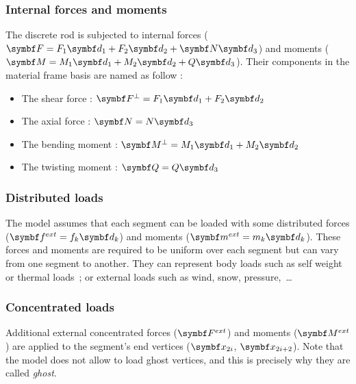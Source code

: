  \subsubsection{Internal forces and moments}
The discrete rod is subjected to internal forces ($\vect{F} = F_1 \vect{d}_1 + F_2 \vect{d}_2 + \vect{N}\vect{d}_3$) and moments ($\vect{M} = M_1 \vect{d}_1 + M_2 \vect{d}_2 + Q\vect{d}_3$). Their components in the material frame basis are named as follow :
\begin{itemize}
\item The shear force : $\vect{F}^{\perp} = F_1 \vect{d}_1 + F_2 \vect{d}_2$
\item The axial force : $\vect{N} = N \vect{d}_3$
\item The bending moment : $\vect{M}^{\perp} = M_1 \vect{d}_1 + M_2 \vect{d}_2$
\item The twisting moment : $\vect{Q} = Q \vect{d}_3$
\end{itemize}

\subsubsection{Distributed loads}
The model assumes that each segment can be loaded with some distributed forces ($\vect{f}^{ext} = f_k\vect{d}_k$) and moments ($\vect{m}^{ext} = m_k\vect{d}_k$). These forces and moments are required to be uniform over each segment but can vary from one segment to another. They can represent body loads such as self weight or thermal loads~; or external loads such as wind, snow, pressure,~\dots

\subsubsection{Concentrated loads}
Additional external concentrated forces ($\vect{F}^{ext}$) and moments ($\vect{M}^{ext}$) are applied to the segment's end vertices ($\vect{x}_{2i}$,  $\vect{x}_{2i+2}$). Note that the model does not allow to load ghost vertices, and this is precisely why they are called \emph{ghost}.

